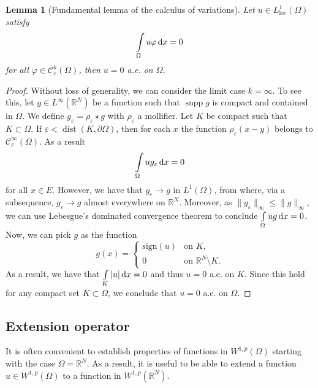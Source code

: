 \documentclass[a4paper,doc,11pt]{article}
\newtheorem{lemma}[theorem]{Lemma}
\newcommand{\R}{\mathbb{R}}
\newcommand{\CC}{\mathcal{C}}
\DeclareMathOperator{\dist}{dist}
\DeclareMathOperator{\supp}{supp}
\begin{document}
\begin{lemma}[Fundamental lemma of the calculus of variations]
    Let \( u \in L^1_{\mathrm{loc}} (\Omega)\) satisfy 
    \[
        \int\limits_\Omega u \varphi \dif x = 0
    \]
    for all \(\varphi \in \CC^k_c (\Omega)\), then \( u = 0 \) a.e. on \(\Omega\).
\end{lemma}
\begin{proof}
    Without loss of generality, we can consider the limit case \(k = \infty\). To see this, let \( g \in L^{\infty} (\R^N)\) be a function such that \( \supp g\) is compact and contained in \(\Omega\). We define \( g_\varepsilon = \rho_\varepsilon \star g\) with \(\rho_\varepsilon\) a mollifier. Let \(K\) be compact such that \( K \subset \Omega\). If \(\varepsilon < \dist (K,\partial \Omega)\), then for each \(x\) the function \( \rho_\varepsilon (x - y)\) belongs to \( \CC^\infty_c (\Omega) \).
    As a result
    \[
         \int\limits_\Omega u g_\varepsilon \dif x = 0
    \]
    for all \( x\in E\). However, we have that \( g_\varepsilon \to g\) in \(L^1 (\Omega)\), from where, via a subsequence, \( g_\varepsilon \to g\) almost everywhere on \(\R^N\). Moreover, as \( \|g_\varepsilon\|_\infty \leq \|g\|_\infty\), we can use Lebesgue's dominated convergence theorem to conclude \( \int\limits_\Omega u g\dif x = 0\). Now, we can pick \(g\) as the function
    \[
        g(x) = 
        \begin{cases}
            \mathrm{sign}(u) & \text{on } K,
            \\
            0   & \text{on } \R^N \setminus K.
        \end{cases}
    \]
    As a result, we have that \( \int\limits_K |u| \dif x = 0\) and thus \( u = 0\) a.e. on \(K\). Since this hold for any compact set \(K \subset \Omega\), we conclude that \( u = 0 \) a.e. on \(\Omega\). 
\end{proof}






\subsection{Extension operator}

It is often convenient to establish properties of functions in \(W^{1,p}(\Omega) \) starting with the case \( \Omega = \R^N\). As a result, it is useful to be able to extend a function \( u \in W^{1,p} (\Omega)\) to a function in \( W^{1,p} (\R^N)\). 
\end{document}
